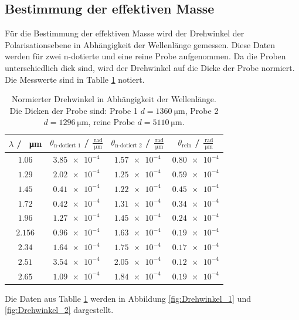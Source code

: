\subsection{Bestimmung der effektiven Masse}
Für die Bestimmung der effektiven Masse wird der Drehwinkel der Polarisationsebene in Abhängigkeit der Wellenlänge gemessen.
Diese Daten werden für zwei n-dotierte und eine reine Probe aufgenommen. Da die Proben unterschiedlich dick sind, wird 
der Drehwinkel auf die Dicke der Probe normiert.
Die Messwerte sind in Tablle \ref{tab:Drehwinkel} notiert.
\FloatBarrier
\begin{table}
  \centering
  \begin{tabular}{c c c c}
    \toprule
    $\lambda$ / \SI{}{\micro\meter}& $\theta_{\text{n-dotiert 1}}$ / $\frac{\SI{}{\radian}}{\SI{}{\micro\meter}}$& 
    $\theta_{\text{n-dotiert 2}}$ / $\frac{\SI{}{\radian}}{\SI{}{\micro\meter}}$&
    $\theta_{\text{rein}}$ / $\frac{\SI{}{\radian}}{\SI{}{\micro\meter}}$\\
    \midrule
    $\num{1.06} $&$\num{3.85e-4}$&$\num{1.57e-4}$&$\num{0.80e-4}$\\
    $\num{1.29} $&$\num{2.02e-4}$&$\num{1.25e-4}$&$\num{0.59e-4}$\\
    $\num{1.45} $&$\num{0.41e-4}$&$\num{1.22e-4}$&$\num{0.45e-4}$\\
    $\num{1.72} $&$\num{0.42e-4}$&$\num{1.31e-4}$&$\num{0.34e-4}$\\
    $\num{1.96} $&$\num{1.27e-4}$&$\num{1.45e-4}$&$\num{0.24e-4}$\\
    $\num{2.156}$&$\num{0.96e-4}$&$\num{1.63e-4}$&$\num{0.19e-4}$\\
    $\num{2.34} $&$\num{1.64e-4}$&$\num{1.75e-4}$&$\num{0.17e-4}$\\
    $\num{2.51} $&$\num{3.54e-4}$&$\num{2.05e-4}$&$\num{0.12e-4}$\\
    $\num{2.65} $&$\num{1.09e-4}$&$\num{1.84e-4}$&$\num{0.19e-4}$\\
    \bottomrule
  \end{tabular}
  \caption{Normierter Drehwinkel in Abhängigkeit der Wellenlänge. Die Dicken der Probe sind: Probe 1 $d=\SI{1360}{\micro\meter}$,
  Probe 2 $d=\SI{1296}{\micro\meter}$, reine Probe $d=\SI{5110}{\micro\meter}$.}
  \label{tab:Drehwinkel}
\end{table}
\FloatBarrier
Die Daten aus Tablle \ref{tab:Drehwinkel} werden in Abbildung \ref{fig:Drehwinkel_1} und \ref{fig:Drehwinkel_2} 
dargestellt.
\FloatBarrier
